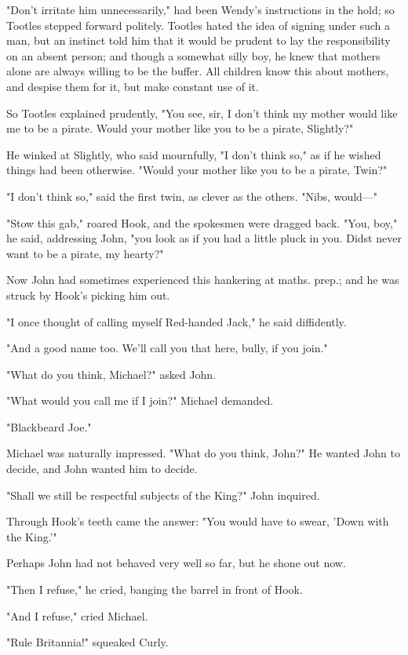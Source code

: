 "Don't irritate him unnecessarily," had been Wendy's instructions in the
hold; so Tootles stepped forward politely. Tootles hated the idea of
signing under such a man, but an instinct told him that it would be
prudent to lay the responsibility on an absent person; and though a
somewhat silly boy, he knew that mothers alone are always willing to be
the buffer. All children know this about mothers, and despise them for it,
but make constant use of it.


So Tootles explained prudently, "You see, sir, I don't think my mother
would like me to be a pirate. Would your mother like you to be a pirate,
Slightly?"


He winked at Slightly, who said mournfully, "I don't think so," as if he
wished things had been otherwise. "Would your mother like you to be a
pirate, Twin?"


"I don't think so," said the first twin, as clever as the others. "Nibs,
would—"


"Stow this gab," roared Hook, and the spokesmen were dragged back. "You,
boy," he said, addressing John, "you look as if you had a little pluck in
you. Didst never want to be a pirate, my hearty?"


Now John had sometimes experienced this hankering at maths. prep.; and he
was struck by Hook's picking him out.


"I once thought of calling myself Red-handed Jack," he said diffidently.


"And a good name too. We'll call you that here, bully, if you join."


"What do you think, Michael?" asked John.


"What would you call me if I join?" Michael demanded.


"Blackbeard Joe."


Michael was naturally impressed. "What do you think, John?" He wanted John
to decide, and John wanted him to decide.


"Shall we still be respectful subjects of the King?" John inquired.


Through Hook's teeth came the answer: "You would have to swear, 'Down with
the King.'"


Perhaps John had not behaved very well so far, but he shone out now.


"Then I refuse," he cried, banging the barrel in front of Hook.


"And I refuse," cried Michael.


"Rule Britannia!" squeaked Curly.


